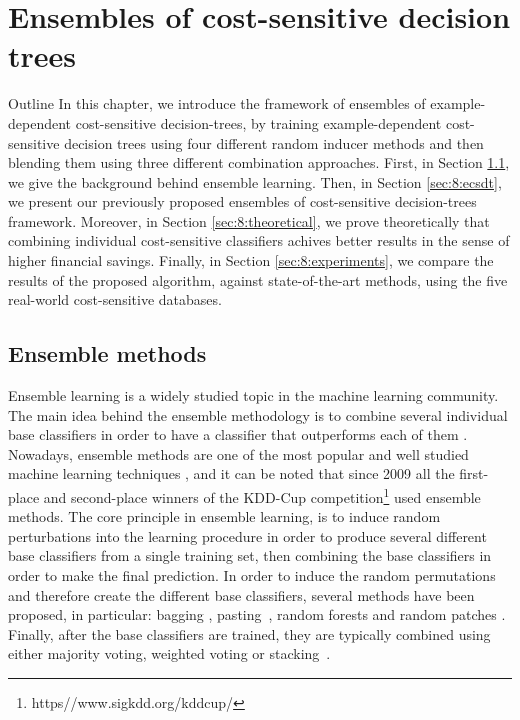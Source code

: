 \chapter{Ensembles of cost-sensitive decision trees}

\begin{remark}{Outline}
In this chapter, we introduce the framework of ensembles of example-dependent cost-sensitive 
decision-trees, by training example-dependent cost-sensitive decision trees using four different 
random inducer methods and then blending them using three different combination approaches.
First, in Section \ref{sec:8:ensemble}, we give the background behind ensemble learning. Then, in 
Section \ref{sec:8:ecsdt}, we present our previously proposed ensembles of cost-sensitive 
decision-trees framework. Moreover, in Section \ref{sec:8:theoretical}, we prove theoretically that 
combining individual cost-sensitive classifiers achives better  results in the sense of higher 
financial savings. Finally, in Section \ref{sec:8:experiments}, we compare the results of the 
proposed algorithm, against state-of-the-art methods, using the five real-world cost-sensitive 
databases.
\end{remark}


\section{Ensemble methods}
\label{sec:8:ensemble}

  Ensemble learning is a widely studied topic in the machine learning community. The main
  idea behind the ensemble methodology is to combine several individual base classifiers in
  order to have a classifier that outperforms each of them \citep{Rokach2009}. Nowadays, 
  ensemble methods are  one of the most popular and well studied machine learning techniques 
  \citep{Zhou2012}, and it can be noted that since 2009 all the first-place and 
  second-place winners of the KDD-Cup competition\footnote{https\://www.sigkdd.org/kddcup/} used 
  ensemble methods. The core principle in ensemble learning, is to induce random perturbations into 
  the learning procedure in order to produce several different base classifiers from a single 
  training set, then combining the base classifiers in order to make the final prediction.
  In order to induce the random permutations and therefore create the different base classifiers, 
  several methods have been proposed, in particular: bagging \citep{Breiman1996}, 
  pasting~\citep{Breiman1999}, random forests \citep{Breiman2001} and random patches 
  \citep{Louppe2012}. Finally, after  the base   classifiers are trained, they are typically 
  combined using either   majority voting,  weighted  voting    or  stacking~\citep{Zhou2012}.

